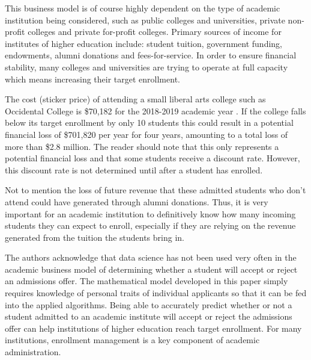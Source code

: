 \documentclass[11pt, oneside]{article}   	%
\begin{document}
This business model is of course highly dependent on the type of academic institution being considered, such as public colleges and universities, private non-profit colleges and private for-profit colleges.
Primary sources of income for institutes of higher education include: student tuition, government funding, endowments, alumni donations and fees-for-service. In order to ensure financial stability, many colleges and universities are  trying to operate at full capacity which means 
increasing their target enrollment.

The cost (sticker price) of attending a small liberal arts college such as Occidental College is \$70,182 for the 2018-2019 academic year \cite{Oxy}. If the college falls below its target enrollment by only 10 students this could result in a potential financial loss of \$701,820 per year for four years, amounting to a total loss of more than \$2.8 million. The reader should note that this only represents a potential financial loss and that some students receive a discount rate. However, this discount rate is not determined until after a student has enrolled.
\begin{comment}
{\bf\color{red} The problem with this prior statement is that the sticker price of  a College is not the actual amount of money they bring in--that's why there is something called the ``discount rate." This is the percentage of the tuition that is actually paid by he average student. I believe Oxy's discount rate is around 34\%.}
\end{comment}
Not to mention the loss of future revenue that these admitted students who don't attend could have generated through alumni donations. Thus, it is very important for an academic institution to definitively know how many incoming students they can expect to enroll, especially if they are relying on the revenue generated from the tuition the students bring in. 

The authors acknowledge that data science has not been used very often in the academic business model of determining whether a student will accept or reject an admissions offer. The mathematical model developed in this paper  simply requires knowledge of personal traits of individual applicants so that it can be fed into the applied algorithms. Being able to accurately predict whether or not a student admitted to an academic institute will accept or reject the admissions offer can help institutions of higher education reach target enrollment. For many institutions, enrollment management is a key component of academic administration.
\end{document}
